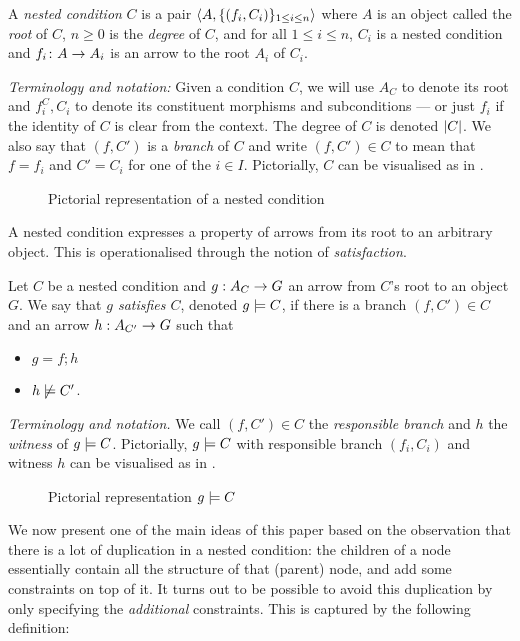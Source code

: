 \begin{definition}
  A \emph{nested condition} $C$ is a pair $\langle{A,\{{(f_i,C_i)}\}_{1\leq i\leq n}}\rangle$ where $A$ is an object called the \emph{root} of $C$, $n\geq 0$ is the \emph{degree} of $C$, and for all $1\leq i\leq n$, $C_i$ is a nested condition and $f_i\colon A\rightarrow A_i$ is an arrow to the root $A_i$ of $C_i$.
\end{definition}
%
\emph{Terminology and notation:} Given a condition $C$, we will use $A_C$ to denote its root and $f^C_i,C_i$ to denote its constituent morphisms and subconditions --- or just $f_i$ if the identity of $C$ is clear from the context. The degree of $C$ is denoted $|{C}|$. We also say that $(f,C')$ is a \emph{branch} of $C$ and write $(f,C')\in C$ to mean that $f=f_i$ and $C'=C_i$ for one of the $i\in I$. Pictorially, $C$ can be visualised as in .
%
\begin{figure}
  \centering
  
  \caption{Pictorial representation of a nested condition}
\end{figure}

\medskip\noindent A nested condition expresses a property of arrows from its root to an arbitrary object. This is operationalised through the notion of \emph{satisfaction}.

\begin{definition}
  Let $C$ be a nested condition and $g:A_C\rightarrow G$ an arrow from $C$'s root to an object $G$. We say that \emph{$g$ satisfies $C$}, denoted $g\models C$, if there is a branch $(f,C')\in C$ and an arrow $h:A_{C'}\rightarrow G$ such that
  \begin{itemize}
  \item $g=f;h$
  \item $h\not\models C'$.
  \end{itemize}
\end{definition}
%
\emph{Terminology and notation.} We call $(f,C')\in C$ the \emph{responsible branch} and $h$ the \emph{witness} of $g\models C$. Pictorially, $g\models C$ with responsible branch $(f_i,C_i)$ and witness $h$ can be visualised as in .
%
\begin{figure}
  \centering
  
  \caption{Pictorial representation $g\models C$}
\end{figure}
%
We now present one of the main ideas of this paper based on the observation that there is a lot of duplication in a nested condition: the children of a node essentially contain all the structure of that (parent) node, and add some constraints on top of it. It turns out to be possible to avoid this duplication by only specifying the \emph{additional} constraints. This is captured by the following definition:

